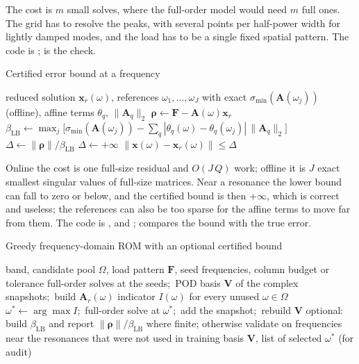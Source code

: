 The cost is $m$ small solves, where the full-order model would need $m$ full ones. The grid has to resolve the peaks, with several points per half-power width for lightly damped modes, and the load has to be a single fixed spatial pattern. The code is ;  is the check.

\begin{algbox}{Certified error bound at a frequency}
\begin{pseudo}
\Require reduced solution $\bm x_r(\omega)$, references $\omega_1,\dots,\omega_J$ with exact $\sigma_{\min}(\bm A(\omega_j))$ (offline), affine terms $\theta_q$, $\|\bm A_q\|_2$
\State $\bm\rho\gets\bm F-\bm A(\omega)\bm x_r$ 
\State $\beta_{\mathrm{LB}}\gets\max_j\big[\sigma_{\min}(\bm A(\omega_j))-\sum_q|\theta_q(\omega)-\theta_q(\omega_j)|\,\|\bm A_q\|_2\big]$ 
 $\Delta\gets\|\bm\rho\|/\beta_{\mathrm{LB}}$ \Else{} $\Delta\gets+\infty$ \EndIf
\Ensure $\|\bm x(\omega)-\bm x_r(\omega)\|\le\Delta$
\end{pseudo}
\end{algbox}

Online the cost is one full-size residual and $O(J\,Q)$ work; offline it is $J$ exact smallest singular values of full-size matrices. Near a resonance the lower bound can fall to zero or below, and the certified bound is then $+\infty$, which is correct and useless; the references can also be too sparse for the affine terms to move far from them. The code is ,  and ;  compares the bound with the true error.


\begin{algbox}{Greedy frequency-domain ROM with an optional certified bound}
\begin{pseudo}
\Require band, candidate pool $\Omega$, load pattern $\bm F$, seed frequencies, column budget or tolerance
\State full-order solves at the seeds;\ POD basis $\bm V$ of the complex snapshots;\ build $\bm A_r(\omega)$
\Repeat
  \State indicator $I(\omega)$ for every unused $\omega\in\Omega$ 
  \State $\omega^\ast\gets\arg\max I$;\ full-order solve at $\omega^\ast$;\ add the snapshot;\ rebuild $\bm V$
\State optional: build $\beta_{\mathrm{LB}}$ and report $\|\bm\rho\|/\beta_{\mathrm{LB}}$ where finite; otherwise validate on frequencies near the resonances that were not used in training
\Ensure basis $\bm V$, list of selected $\omega^\ast$ (for audit)
\end{pseudo}
\end{algbox}

